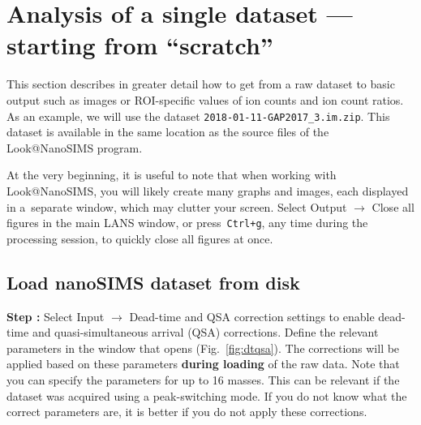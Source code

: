 \documentclass[a4paper, 11pt]{article}
\newcommand{\ttt}[1]{\texttt{#1}}
\newcommand{\lans}[1]{{\color{magenta}#1}}
\newcommand\ra{\rightarrow}
\newcounter{step}
\newcommand\s{\addtocounter{step}{1}\vskip5pt\noindent\textbf{Step \thestep:}{ }}
\newcommand\bb[1]{\textbf{#1}}
\begin{document}
\section{Analysis of a single dataset --- starting from ``scratch''}
\label{sec:level1}

This section describes in greater detail how to get from a raw dataset to basic output such as images or ROI-specific values of ion counts and ion count ratios. As an example, we will use the dataset \ttt{2018-01-11-GAP2017\_3.im.zip}. This dataset is available in the same location as the source files of the Look@NanoSIMS program.

At the very beginning, it is useful to note that when working with Look@NanoSIMS, you will likely create many graphs and images, each displayed in a~separate window, which may clutter your screen. Select \lans{Output} $\ra$ \lans{Close all figures} in the main LANS window, or press~\ttt{Ctrl+g}, any time during the processing session, to quickly close all figures at once.


\subsection{Load nanoSIMS dataset from disk}
\setcounter{step}{0}

\s Select \lans{Input} $\ra$ \lans{Dead-time and QSA correction settings} to enable dead-time and quasi-simul\-ta\-neous arrival (QSA) corrections. Define the relevant parameters in the window that opens (Fig.~\ref{fig:dtqsa}). The corrections will be applied based on these parameters \bb{during loading} of the raw data. Note that you can specify the parameters for up to 16 masses. This can be relevant if the dataset was acquired using a peak-switching mode. If you do not know what the correct parameters are, it is better if you do not apply these corrections.
\end{document}
